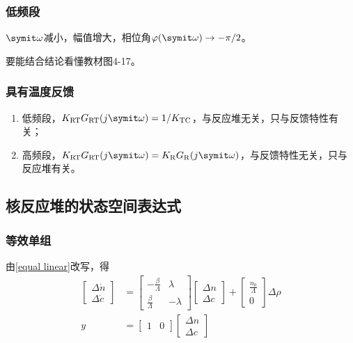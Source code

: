 \subsubsection{低频段}
$\varomega$减小，幅值增大，相位角$\varphi(\varomega) \to -\pi/2$。

要能结合结论看懂教材图4-17。

\subsubsection{具有温度反馈}

\begin{enumerate}
    \item 低频段，$K_{\rm RT}G_{\rm RT}(j\varomega) = 1/K_{\rm TC}$，与反应堆无关，只与反馈特性有关；
    \item 高频段，$K_{\rm RT}G_{\rm RT}(j\varomega) = K_{\rm R}G_{\rm R}(j\varomega)$，与反馈特性无关，只与反应堆有关。
\end{enumerate}

\subsection{核反应堆的状态空间表达式}

\subsubsection{等效单组}
由\cref{equal linear}改写，得
\begin{align}
    \begin{bmatrix}
        \Delta \dot{n} \\
        \Delta \dot{c}
    \end{bmatrix} &= \begin{bmatrix}
        -\frac{\beta}{\varLambda} & \lambda \\
        \frac{\beta}{\varLambda} & -\lambda
    \end{bmatrix} \begin{bmatrix}
        \Delta n \\
        \Delta c
    \end{bmatrix} + \begin{bmatrix}
        \frac{n_0}{\varLambda} \\
        0
    \end{bmatrix} \Delta \rho \\
    y &= \begin{bmatrix}
        1 & 0
    \end{bmatrix} \begin{bmatrix}
        \Delta n \\
        \Delta c
    \end{bmatrix}
\end{align}

